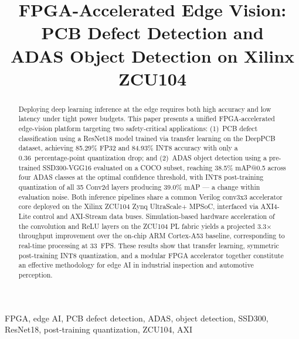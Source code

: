 \documentclass[conference]{IEEEtran}
\begin{document}
\title{FPGA-Accelerated Edge Vision: PCB Defect Detection and\\
ADAS Object Detection on Xilinx ZCU104}

\author{
\and
{}
}

\maketitle

\begin{abstract}
Deploying deep learning inference at the edge requires both high accuracy and low latency under tight power budgets. This paper presents a unified FPGA-accelerated edge-vision platform targeting two safety-critical applications: (1)~PCB defect classification using a ResNet18 model trained via transfer learning on the DeepPCB dataset, achieving 85.29\% FP32 and 84.93\% INT8 accuracy with only a 0.36~percentage-point quantization drop; and (2)~ADAS object detection using a pre-trained SSD300-VGG16 evaluated on a COCO subset, reaching 38.5\% mAP@0.5 across four ADAS classes at the optimal confidence threshold, with INT8 post-training quantization of all 35 Conv2d layers producing 39.0\% mAP --- a change within evaluation noise. Both inference pipelines share a common Verilog conv3x3 accelerator core deployed on the Xilinx ZCU104 Zynq UltraScale+ MPSoC, interfaced via AXI4-Lite control and AXI-Stream data buses. Simulation-based hardware acceleration of the convolution and ReLU layers on the ZCU104 PL fabric yields a projected 3.3$\times$ throughput improvement over the on-chip ARM Cortex-A53 baseline, corresponding to real-time processing at 33~FPS. These results show that transfer learning, symmetric post-training INT8 quantization, and a modular FPGA accelerator together constitute an effective methodology for edge AI in industrial inspection and automotive perception.
\end{abstract}

\begin{IEEEkeywords}
FPGA, edge AI, PCB defect detection, ADAS, object detection, SSD300, ResNet18, post-training quantization, ZCU104, AXI
\end{IEEEkeywords}
\end{document}
